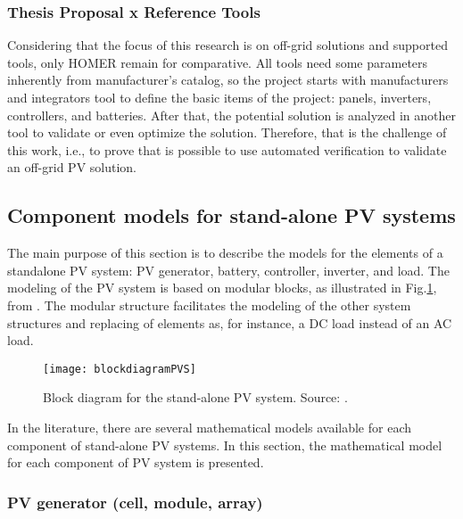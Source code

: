 \subsubsection{Thesis Proposal x Reference Tools}

Considering that the focus of this research is on off-grid solutions and supported tools, only HOMER remain for comparative. All tools need some parameters inherently from manufacturer's catalog, so the project starts with manufacturers and integrators tool to define the basic items of the project: panels, inverters, controllers, and batteries. After that, the potential solution is analyzed in another tool to validate or even optimize the solution. Therefore, that is the challenge of this work, i.e., to prove that is possible to use automated verification to validate an off-grid PV solution.

\subsection{Component models for stand-alone PV systems}
\label{model}

The main purpose of this section is to describe the models for the elements of a standalone PV system: PV generator, battery, controller, inverter, and load. The modeling of the PV system is based on modular blocks, as illustrated in Fig.\ref{fig:blockdiagram}, from \cite{Hansen}. The modular structure facilitates the modeling of the other system structures and replacing of elements as, for instance, a DC load instead of an AC load. 

\begin{figure}[h]
\texttt{[image: blockdiagramPVS]}
\centering
\caption{Block diagram for the stand-alone PV system. Source: \cite{Hansen}.}
\label{fig:blockdiagram}
\end{figure}

In the literature, there are several mathematical models available for each component of stand-alone PV systems. In this section, the mathematical model for each component of PV system is presented. 

\subsubsection{PV generator (cell, module, array) }

